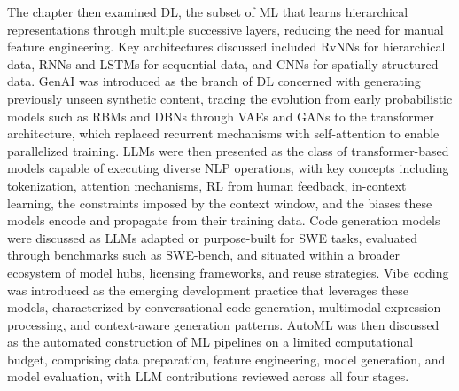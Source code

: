 \documentclass[
english,                 %
bibtex,                  %
includeExtraAbstracts, %
]{kththesis}
\numberwithin{listing}{chapter}
\begin{document}
The chapter then examined \gls{DL}, the subset of \gls{ML} that learns hierarchical representations through multiple successive layers, reducing the need for manual feature engineering. Key architectures discussed included \glspl{RvNN} for hierarchical data, \glspl{RNN} and \glspl{LSTM} for sequential data, and \glspl{CNN} for spatially structured data. \Gls{GenAI} was introduced as the branch of \gls{DL} concerned with generating previously unseen synthetic content, tracing the evolution from early probabilistic models such as \glspl{RBM} and \glspl{DBN} through \glspl{VAE} and \glspl{GAN} to the transformer architecture, which replaced recurrent mechanisms with self-attention to enable parallelized training. \Glspl{LLM} were then presented as the class of transformer-based models capable of executing diverse \gls{NLP} operations, with key concepts including tokenization, attention mechanisms, \gls{RL} from human feedback, in-context learning, the constraints imposed by the context window, and the biases these models encode and propagate from their training data. Code generation models were discussed as \glspl{LLM} adapted or purpose-built for \gls{SWE} tasks, evaluated through benchmarks such as \gls{SWE}-bench, and situated within a broader ecosystem of model hubs, licensing frameworks, and reuse strategies. Vibe coding was introduced as the emerging development practice that leverages these models, characterized by conversational code generation, multimodal expression processing, and context-aware generation patterns. \Gls{AutoML} was then discussed as the automated construction of \gls{ML} pipelines on a limited computational budget, comprising data preparation, feature engineering, model generation, and model evaluation, with \gls{LLM} contributions reviewed across all four stages.
\end{document}
